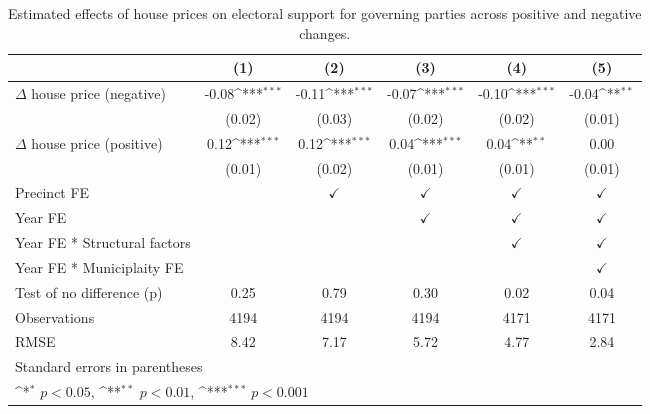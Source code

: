 \begin{table}[htbp]\centering
\def\sym#1{\ifmmode^{#1}\else\(^{#1}\)\fi}
\caption{Estimated effects of house prices on electoral support for governing parties across positive and negative changes.} \label{tab4}
\begin{tabular}{l*{5}{c}}
\hline\hline
                    &\multicolumn{1}{c}{(1)}         &\multicolumn{1}{c}{(2)}         &\multicolumn{1}{c}{(3)}         &\multicolumn{1}{c}{(4)}         &\multicolumn{1}{c}{(5)}         \\
\hline
$\Delta$ house price (negative)&       -0.08\sym{***}&       -0.11\sym{***}&       -0.07\sym{***}&       -0.10\sym{***}&       -0.04\sym{**} \\
                    &      (0.02)         &      (0.03)         &      (0.02)         &      (0.02)         &      (0.01)         \\
[1em]
$\Delta$ house price (positive)&        0.12\sym{***}&        0.12\sym{***}&        0.04\sym{***}&        0.04\sym{**} &        0.00         \\
                    &      (0.01)         &      (0.02)         &      (0.01)         &      (0.01)         &      (0.01)         \\
[1em]
\hline Precinct  FE &                     &$\checkmark$         &$\checkmark$         &$\checkmark$         &$\checkmark$         \\
[1em]
Year FE             &                     &                     &$\checkmark$         &$\checkmark$         &$\checkmark$         \\
[1em]
Year FE * Structural factors&                     &                     &                     &$\checkmark$         &$\checkmark$         \\
[1em]
Year FE * Municiplaity FE&                     &                     &                     &                     &$\checkmark$         \\
\hline
Test of no difference (p)&        0.25         &        0.79         &        0.30         &        0.02         &        0.04         \\
Observations        &        4194         &        4194         &        4194         &        4171         &        4171         \\
RMSE                &        8.42         &        7.17         &        5.72         &        4.77         &        2.84         \\
\hline\hline
\multicolumn{6}{l}{\footnotesize Standard errors in parentheses}\\
\multicolumn{6}{l}{\footnotesize \sym{*} \(p<0.05\), \sym{**} \(p<0.01\), \sym{***} \(p<0.001\)}\\
\end{tabular}
\end{table}
